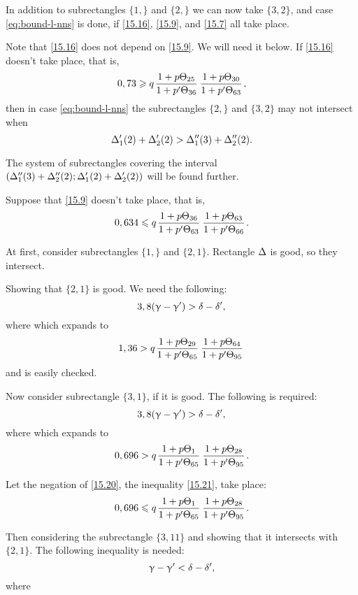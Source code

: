 In addition to subrectangles $\{1,\}$ and $\{2,\}$ we can now take $\{3, 2\}$,
and case \ref{eq:bound-l-nns} is done, if \ref{15.16}, \ref{15.9}, and \ref{15.7} all take place.

Note that \ref{15.16} does not depend on \ref{15.9}.
We will need it below.
If \ref{15.16} doesn't take place, that is,
\begin{equation}\label{15.18}
	0,73 \geqslant q \up{25}{36} \up{30}{63},
\end{equation}
then in case \ref{eq:bound-l-nns} the subrectangles $\{2,\}$ and $\{3, 2\}$ may not intersect when
\begin{equation*}
	\Delta_1'(2) + \Delta_2'(2) > \Delta_1''(3) + \Delta_2''(2).
\end{equation*}

The system of subrectangles covering the interval $\left(\Delta_1''(3) + \Delta_2''(2); \Delta_1'(2) + \Delta_2'(2)\right)$
will be found further.

Suppose that \ref{15.9} doesn't take place, that is,
\begin{equation}\label{15.19}
	0,634 \leqslant q \up{36}{63} \up{63}{66}.
\end{equation}

At first, consider subrectangles $\{1,\}$ and $\{2, 1\}$.
Rectangle $\Delta$ is good, so they intersect.

Showing that $\{2, 1\}$ is good.
We need the following:
\begin{equation}
	3,8 (\upgamma - \upgamma') > \delta - \delta',
\end{equation}
where
which expands to
\begin{equation*}
	1,36 > q \up{29}{65} \up{64}{95}
\end{equation*}
and is easily checked.

Now consider subrectangle $\{3, 1\}$, if it is good.
The following is required:
\begin{equation*}
	3,8 (\upgamma - \upgamma') > \delta - \delta',
\end{equation*}
where
which expands to
\begin{equation}\label{15.20}
	0,696 > q \up{1}{65} \up{28}{95}.
\end{equation}

Let the negation of \ref{15.20}, the inequality \ref{15.21}, take place:
\begin{equation}\label{15.21}
	0,696 \leqslant q \up{1}{65} \up{28}{95}.
\end{equation}

Then considering the subrectangle $\{3, 11\}$ and showing that it intersects with $\{2, 1\}$.
The following inequality is needed:
\begin{equation}\label{15.22}
	\upgamma - \upgamma' < \delta - \delta',
\end{equation}
where


